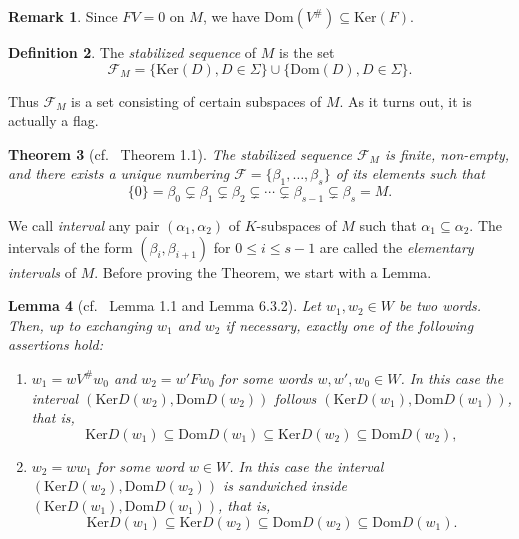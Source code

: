 \documentclass[12pt]{amsart}
\newtheorem{theorem}{Theorem}[section]
\newtheorem{lemma}[theorem]{Lemma}
\theoremstyle{definition}
\newtheorem{definition}[theorem]{Definition}
\newtheorem{remark}[theorem]{Remark}
\newcommand{\<}{\langle}   %
\renewcommand{\>}{\rangle} %
\begin{document}
\begin{remark}
    Since $FV = 0$ on $M$, we have $\mathrm{Dom}(V^{\#}) \subseteq  \mathrm{Ker}(F)$.
\end{remark}

\begin{definition}
    The \textit{stabilized sequence} of $M$ is the set 
    \begin{equation*}
        \mathcal F_M = \{\mathrm{Ker}(D), D \in \Sigma\} \cup \{\mathrm{Dom}(D), D\in \Sigma\}.
    \end{equation*}
\end{definition}

Thus $\mathcal F_M$ is a set consisting of certain subspaces of $M$. As it turns out, it is actually a flag. 

\begin{theorem}[cf.~\cite{gelfand-ponomarev:1968} Theorem 1.1]\label{TheoremStabilizedSequence}
    The stabilized sequence $\mathcal F_M$ is finite, non-empty, and there exists a unique numbering $\mathcal F = \{\beta_1, \ldots , \beta_s\}$ of its elements such that 
    \begin{equation*}
        \{0\} = \beta_0 \subsetneq \beta_1 \subsetneq \beta_2 \subsetneq \cdots \subsetneq \beta_{s-1} \subsetneq \beta_s = M.
    \end{equation*}
\end{theorem}

We call \textit{interval} any pair $(\alpha_1,\alpha_2)$ of $K$-subspaces of $M$ such that $\alpha_1 \subseteq  \alpha_2$. The intervals of the form $(\beta_i,\beta_{i+1})$ for $0 \leq i \leq s-1$ are called the \textit{elementary intervals} of $M$. Before proving the Theorem, we start with a Lemma.

\begin{lemma}[cf.~\cite{gelfand-ponomarev:1968} Lemma 1.1 and \cite{chai:kraft2025} Lemma 6.3.2]\label{LemmaRelativePositionIntervals}
    Let $w_1,w_2 \in W$ be two words. Then, up to exchanging $w_1$ and $w_2$ if necessary, exactly one of the following assertions hold:
    \begin{enumerate}
        \item $w_1 = wV^{\#}w_0$ and $w_2 = w'Fw_0$ for some words $w,w',w_0 \in W$. In this case the interval $(\mathrm{Ker}D(w_2),\mathrm{Dom}D(w_2))$ follows $(\mathrm{Ker}D(w_1),\mathrm{Dom}D(w_1))$, that is,
        \begin{equation*}
            \mathrm{Ker}D(w_1) \subseteq  \mathrm{Dom}D(w_1) \subseteq  \mathrm{Ker}D(w_2) \subseteq  \mathrm{Dom}D(w_2),
        \end{equation*}
        \item $w_2 = ww_1$ for some word $w \in W$. In this case the interval $(\mathrm{Ker}D(w_2),\mathrm{Dom}D(w_2))$ is sandwiched inside $(\mathrm{Ker}D(w_1),\mathrm{Dom}D(w_1))$, that is,
        \begin{equation*}
            \mathrm{Ker}D(w_1) \subseteq  \mathrm{Ker}D(w_2) \subseteq  \mathrm{Dom}D(w_2) \subseteq  \mathrm{Dom}D(w_1).
        \end{equation*}
    \end{enumerate}
\end{lemma}
\end{document}
